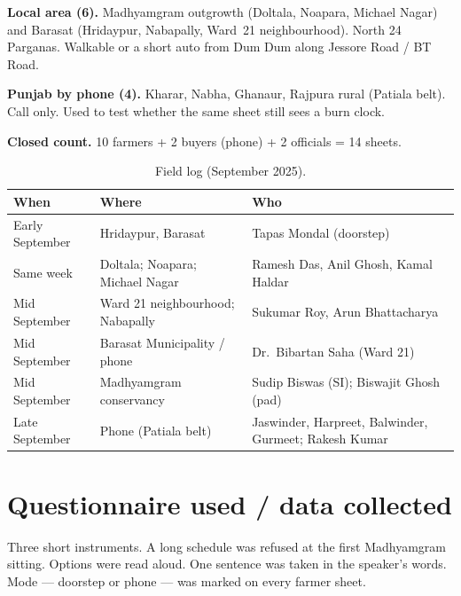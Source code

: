 \documentclass[12pt,a4paper]{article}
\begin{document}
\textbf{Local area (6).} Madhyamgram outgrowth (Doltala, Noapara, Michael Nagar) and Barasat (Hridaypur, Nabapally, Ward~21 neighbourhood). North 24 Parganas. Walkable or a short auto from Dum Dum along Jessore Road / BT Road.

\textbf{Punjab by phone (4).} Kharar, Nabha, Ghanaur, Rajpura rural (Patiala belt). Call only. Used to test whether the same sheet still sees a burn clock.

\textbf{Closed count.} 10 farmers + 2 buyers (phone) + 2 officials = 14 sheets.

\begin{table}[h]
\centering
\caption{Field log (September 2025).}
\label{tab:log}
\small
\begin{tabularx}{\textwidth}{@{}>{\raggedright\arraybackslash}p{3.2cm}>{\raggedright\arraybackslash}X>{\raggedright\arraybackslash}X@{}}
\toprule
\textbf{When} & \textbf{Where} & \textbf{Who} \\
\midrule
Early September & Hridaypur, Barasat & Tapas Mondal (doorstep) \\
Same week & Doltala; Noapara; Michael Nagar & Ramesh Das, Anil Ghosh, Kamal Haldar \\
Mid September & Ward 21 neighbourhood; Nabapally & Sukumar Roy, Arun Bhattacharya \\
Mid September & Barasat Municipality / phone & Dr.\ Bibartan Saha (Ward 21) \\
Mid September & Madhyamgram conservancy & Sudip Biswas (SI); Biswajit Ghosh (pad) \\
Late September & Phone (Patiala belt) & Jaswinder, Harpreet, Balwinder, Gurmeet; Rakesh Kumar \\
\bottomrule
\end{tabularx}
\end{table}

\section{Questionnaire used / data collected}
Three short instruments. A long schedule was refused at the first Madhyamgram sitting. Options were read aloud. One sentence was taken in the speaker's words. Mode --- doorstep or phone --- was marked on every farmer sheet.
\end{document}

